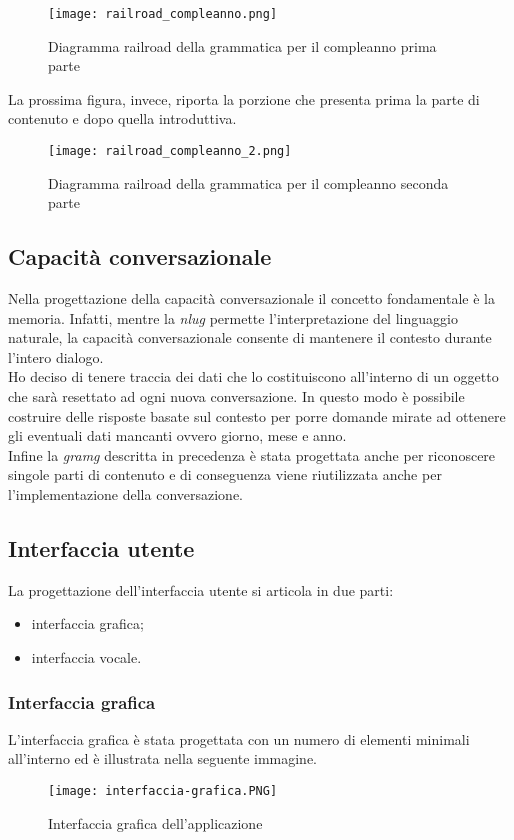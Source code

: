 	\begin{figure}[htbp]
		\begin{center}
			\texttt{[image: railroad\_compleanno.png]}
			\caption{Diagramma railroad della grammatica per il compleanno prima parte}
		\end{center}
	\end{figure}

	La prossima figura, invece, riporta la porzione che presenta prima la parte di contenuto e dopo quella introduttiva.
	\begin{figure}[htbp]
		\begin{center}
			\texttt{[image: railroad\_compleanno\_2.png]}
			\caption{Diagramma railroad della grammatica per il compleanno seconda parte}
		\end{center}
	\end{figure}

	\subsection{Capacità conversazionale}
	Nella progettazione della capacità conversazionale il concetto fondamentale è la memoria. Infatti, mentre la \emph{\gls{nlug}} permette l'interpretazione del linguaggio naturale, la capacità conversazionale consente di mantenere il contesto durante l'intero dialogo. \\
	Ho deciso di tenere traccia dei dati che lo costituiscono all'interno di un oggetto che sarà resettato ad ogni nuova conversazione. In questo modo è possibile costruire delle risposte basate sul contesto per porre domande mirate ad ottenere gli eventuali dati mancanti ovvero giorno, mese e anno. \\
	Infine la \emph{\gls{gramg}} descritta in precedenza è stata progettata anche per riconoscere singole parti di contenuto e di conseguenza viene riutilizzata anche per l'implementazione della conversazione. 
	\subsection{Interfaccia utente}
	La progettazione dell'interfaccia utente si articola in due parti:
	\begin{itemize}
		\item interfaccia grafica;
		\item interfaccia vocale.
	\end{itemize}
		\subsubsection{Interfaccia grafica}
		L'interfaccia grafica è stata progettata con un numero di elementi minimali all'interno ed è illustrata nella seguente immagine.
		\begin{figure}[htbp]
			\begin{center}
				\texttt{[image: interfaccia-grafica.PNG]}
				\caption{Interfaccia grafica dell'applicazione}
			\end{center}
		\end{figure}
	
